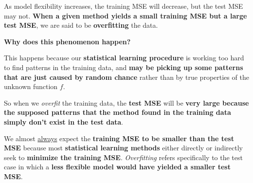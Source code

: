 \documentclass[a4paper]{article}
\newcommand{\definition}[1]{\textcolor{Red3}{\textbf{#1}}\index{#1}}
\newcommand{\highspace}{\vspace{1.2em}\noindent}
\begin{document}
    As model flexibility increases, the training MSE will decrease, but the test MSE may not. \textbf{When a given method yields a small training MSE but a large test MSE}, we are said to be \definition{overfitting} the data.

    \begin{flushleft}
        \textcolor{Green3}{ \textbf{Why does this phenomenon happen?}}
    \end{flushleft}
    This happens because our \textbf{statistical learning procedure} is working too hard to find patterns in the training data, and \textbf{may be picking up some patterns that are just caused by random chance} rather than by true properties of the unknown function $f$.

    \noindent
    So when we \emph{overfit} the training data, the \textbf{test MSE} will be \textbf{very large because the supposed patterns that the method found in the training data simply don't exist in the test data}.

    \highspace
    We almost \underline{always} expect the \textbf{training MSE to be smaller than the test MSE} because most \textbf{statistical learning methods} either directly or indirectly seek to \textbf{minimize the training MSE}. \emph{Overfitting} refers specifically to the test case in which a \textbf{less flexible model would have yielded a smaller test MSE}.
\end{document}
